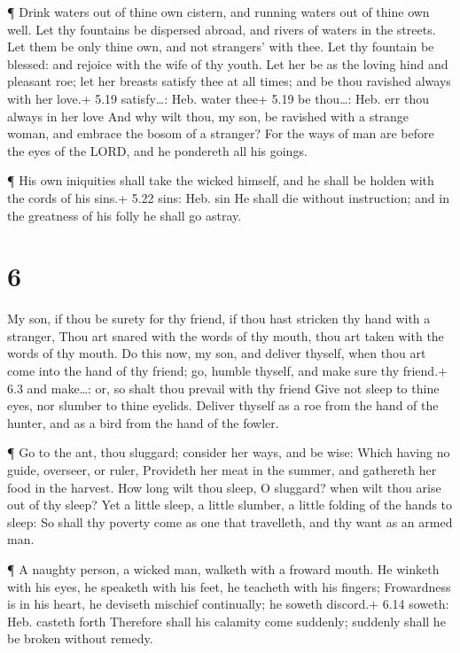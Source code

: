  ¶ Drink waters out of thine own cistern, and running
waters out of thine own well.  Let thy fountains be
dispersed abroad, and rivers of waters in the streets.  Let
them be only thine own, and not strangers' with thee.  Let
thy fountain be blessed: and rejoice with the wife of thy youth.
 Let her be as the loving hind and pleasant roe; let her
breasts satisfy thee at all times; and be thou ravished always with her
love.+ 5.19 satisfy\ldots: Heb. water thee+ 5.19 be thou\ldots: Heb. err
thou always in her love  And why wilt thou, my son, be
ravished with a strange woman, and embrace the bosom of a stranger?
 For the ways of man are before the eyes of the LORD, and
he pondereth all his goings.

 ¶ His own iniquities shall take the wicked himself, and he
shall be holden with the cords of his sins.+ 5.22 sins: Heb. sin
 He shall die without instruction; and in the greatness of
his folly he shall go astray.

\hypertarget{section-5}{%
\section{6}\label{section-5}}

 My son, if thou be surety for thy friend, if thou hast
stricken thy hand with a stranger,  Thou art snared with the
words of thy mouth, thou art taken with the words of thy mouth.
 Do this now, my son, and deliver thyself, when thou art
come into the hand of thy friend; go, humble thyself, and make sure thy
friend.+ 6.3 and make\ldots: or, so shalt thou prevail with thy friend
 Give not sleep to thine eyes, nor slumber to thine eyelids.
 Deliver thyself as a roe from the hand of the hunter, and
as a bird from the hand of the fowler.

 ¶ Go to the ant, thou sluggard; consider her ways, and be
wise:  Which having no guide, overseer, or ruler,
 Provideth her meat in the summer, and gathereth her food in
the harvest.  How long wilt thou sleep, O sluggard? when
wilt thou arise out of thy sleep?  Yet a little sleep, a
little slumber, a little folding of the hands to sleep:  So
shall thy poverty come as one that travelleth, and thy want as an armed
man.

 ¶ A naughty person, a wicked man, walketh with a froward
mouth.  He winketh with his eyes, he speaketh with his
feet, he teacheth with his fingers;  Frowardness is in his
heart, he deviseth mischief continually; he soweth discord.+ 6.14
soweth: Heb. casteth forth  Therefore shall his calamity
come suddenly; suddenly shall he be broken without remedy.

